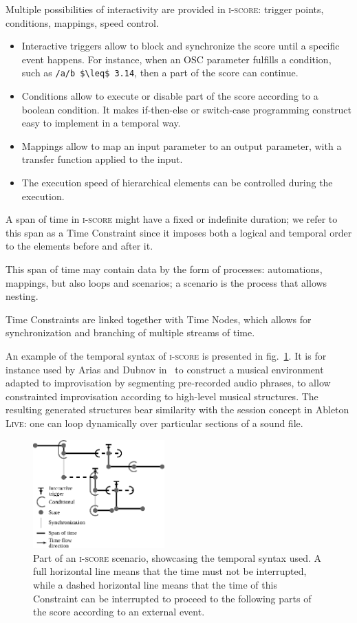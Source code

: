 \documentclass{article}
\newcommand*{\iscore}{\textsc{i-score}\xspace}
\newcommand*{\abletonlive}{Ableton \textsc{Live}\xspace}
\begin{document}
Multiple possibilities of interactivity are provided in \iscore: trigger points, conditions, 
mappings, speed control.
\begin{itemize}
    \item Interactive triggers allow to block and synchronize the score until a specific event happens.
    For instance, when an OSC parameter fulfills a condition, such as  \lstinline[mathescape]!/a/b $\leq$ 3.14!, then 
    a part of the score can continue.
    \item Conditions allow to execute or disable part of the score according to a boolean condition.
    It makes if-then-else or switch-case programming construct easy to implement in a temporal way.
    \item Mappings allow to map an input parameter to an output parameter, with a transfer function applied to the input.
    \item The execution speed of hierarchical elements can be controlled during the execution.
\end{itemize}

A span of time in \iscore might have a fixed or indefinite duration;
we refer to this span as a Time Constraint since it imposes both a logical and temporal order to the elements before and after it.
 
This span of time may contain data by the form of processes: automations, mappings, but also loops and scenarios; a scenario is the process that allows nesting. 

Time Constraints are linked together with Time Nodes, which allows for synchronization and branching of multiple streams of time.

An example of the temporal syntax of \iscore is presented in fig.~\ref{fig.iscore-example}.
It is for instance used by Arias and Dubnov in~\cite{Arias:VMO-Score} to construct a musical environment adapted to improvisation by segmenting pre-recorded audio phrases, to allow constrainted improvisation according to high-level musical structures.
The resulting generated structures bear similarity with the session concept in \abletonlive: one can loop dynamically over particular sections of a sound file. 

\begin{figure}
	\centering
	\includegraphics[width=0.45\textwidth]{figures/iscore-example.eps}
	\caption{Part of an \iscore scenario, showcasing the temporal syntax used. 
		A full horizontal line means that the time must not be interrupted, 
		while a dashed horizontal line means that the time of this Constraint can be interrupted to proceed 
		to the following parts of the score according to an external event.}
	\label{fig.iscore-example}
\end{figure}
\end{document}
